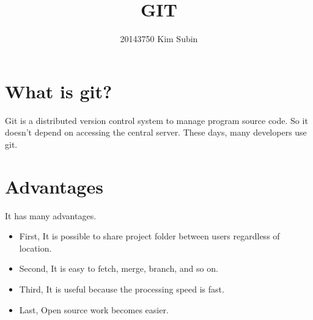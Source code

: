\documentclass[a4paper]{article}
\title{GIT}
\author{20143750 Kim Subin}
\begin{document}
\maketitle

\section{What is git?}

Git is a distributed version control system to manage program source code. So it doesn't depend on accessing the central server. These days, many developers use git.

\section{Advantages}
It has many advantages. 
\begin{itemize}
	\item First, It is possible to share project folder between users regardless of location. 
    \item Second, It is easy to fetch, merge, branch, and so on. 
    \item Third, It is useful because the processing speed is fast. 		
    \item Last, Open source work becomes easier.
\end{itemize}
\end{document}
